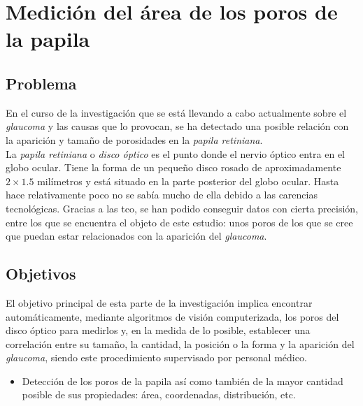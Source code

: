 \chapter{Medición del área de los poros de la papila}
\section{Problema}
En el curso de la investigación que se está llevando a cabo
actualmente sobre el \emph{glaucoma} y las causas que lo provocan, se
ha detectado una posible relación con la aparición y tamaño de
porosidades en la \emph{papila retiniana}. \\
La \emph{papila retiniana} o \emph{disco óptico} es el punto donde el
nervio óptico entra en el globo ocular. Tiene la forma de un pequeño
disco rosado de aproximadamente $2 \times 1.5$ milímetros y está
situado en la parte posterior del globo ocular. Hasta hace
relativamente poco no se sabía mucho de ella debido a las carencias
tecnológicas. Gracias a las \gls{tco}, se han podido conseguir datos
con cierta precisión, entre los que se encuentra el objeto de este
estudio: unos poros de los que se cree que puedan estar
relacionados con la aparición del \emph{glaucoma}.\\

\section{Objetivos}
El objetivo principal de esta parte de la investigación implica
encontrar automáticamente, mediante algoritmos de visión
computerizada, los poros del disco óptico para medirlos y, en la
medida de lo posible, establecer una correlación entre su tamaño, la
cantidad, la posición o la forma y la aparición del \emph{glaucoma},
siendo este procedimiento supervisado por personal médico.
\begin{itemize}
\item Detección de los poros de la papila así como también de la mayor
  cantidad posible de sus propiedades: área, coordenadas,
  distribución, etc.
\end{itemize}

